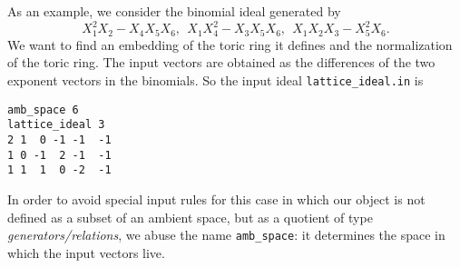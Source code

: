 \documentclass[12pt,a4paper]{scrartcl}
\theoremstyle{definition}
\begin{document}
As an example, we consider the binomial ideal generated by
$$
X_1^2X_2-X_4X_5X_6,\ \ X_1X_4^2-X_3X_5X_6,\ \ X_1X_2X_3-X_5^2X_6.
$$
We want to find an embedding of the toric ring it defines and
the normalization of the toric ring. The input vectors are obtained as the differences of the two exponent vectors in the binomials. So the input ideal \verb+lattice_ideal.in+ is
\begin{Verbatim}
amb_space 6
lattice_ideal 3
2 1  0 -1 -1  -1
1 0 -1  2 -1  -1
1 1  1  0 -2  -1
\end{Verbatim}
In order to avoid special input rules for this case in which our object is not defined as a subset of an ambient space, but as a quotient of type \emph{generators/relations}, we abuse the name \verb|amb_space|: it determines the space in which the input vectors live.
\end{document}

